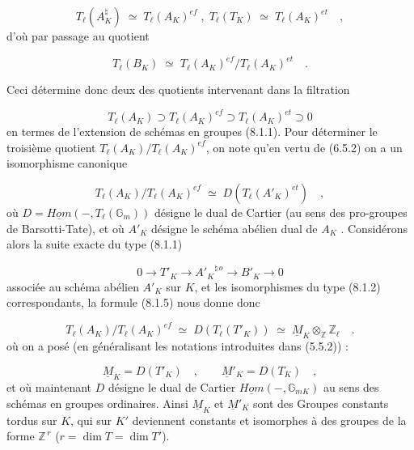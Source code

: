 \begin{equation}\tag{8.1.2}
T_{\ell}(A_K^{\natural}) \;\simeq\; T_{\ell}(A_K)^{ef} \; , \; T_{\ell}(T_K) \;\simeq\; T_{\ell}(A_K)^{et} \quad ,
\end{equation}
d'où par passage au quotient

\begin{equation}\tag{8.1.3}
T_{\ell}(B_K) \;\simeq\; T_{\ell}(A_K)^{ef}/T_{\ell}(A_K)^{et} \quad .
\end{equation}


Ceci détermine donc deux des quotients intervenant dans la filtration

\begin{equation}\tag{8.1.4}
T_\ell(A_K) \supset T_\ell(A_K)^{ef} \supset T_\ell(A_K)^{et} \supset 0
\end{equation}
en termes de l'extension de schémas en groupes (8.1.1). Pour déterminer le troisième quotient $T_\ell(A_K)/T_\ell(A_K)^{ef}$, on note qu'en vertu de (6.5.2) on a un isomorphisme canonique

\begin{equation}\tag{8.1.5}
T_\ell(A_K)/T_\ell(A_K)^{ef} \;\simeq\; D(T_\ell(A'_K)^{et}) \quad ,
\end{equation}
où $D = \underline{Hom}( - , T_\ell(\mathbb{G}_m))$ désigne le dual de Cartier (au sens des pro-groupes de Barsotti-Tate), et où $A'_K$ désigne le schéma abélien dual de $A_K$ . Considérons alors la suite exacte du type (8.1.1)

\begin{equation}\tag{8.1.6}
0 \longrightarrow T'_K \longrightarrow {A'_K}^{\natural\,o} \longrightarrow B'_K \longrightarrow 0
\end{equation}
associée au schéma abélien $A'_K$ sur $K$, et les isomorphismes du type (8.1.2) correspondants, la formule (8.1.5) nous donne donc

\begin{equation}\tag{8.1.7}
T_\ell(A_K)/T_\ell(A_K)^{ef} \;\simeq\; D(T_\ell(T'_K)) \;\simeq\; \underline{M}_K \otimes_{\mathbb{Z}} \mathbb{Z}_\ell \quad .
\end{equation}
où on a posé (en généralisant les notations introduites dans (5.5.2)) :

\begin{equation}\tag{8.1.8}
\underline{M}_K = D(T'_K) \quad , \qquad \underline{M}'_K = D(T_K) \quad ,
\end{equation}
et où maintenant $D$ désigne le dual de Cartier $\underline{Hom}( - , \mathbb{G}_{mK})$ au sens des schémas en groupes ordinaires. Ainsi $\underline{M}_K$ et $\underline{M}'_K$ sont des Groupes constants tordus sur $K$, qui sur $K'$ deviennent constants et isomorphes à des groupes de la forme $\mathbb{Z}^{\,r}$ ($r=\dim T = \dim T'$).


